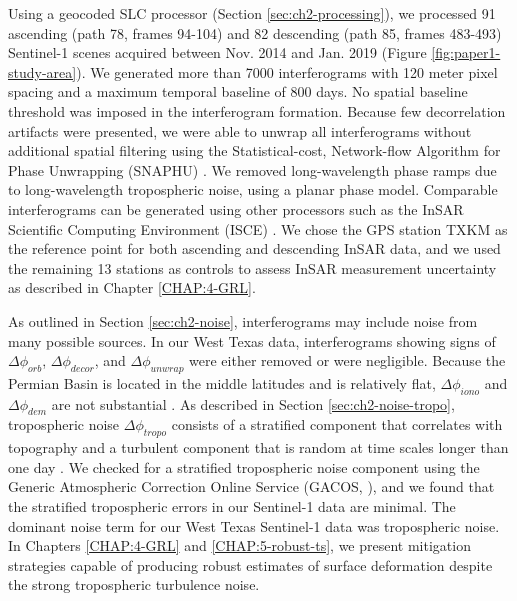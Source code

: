 Using a geocoded SLC processor \citep{Zheng2017PhaseCorrectionSingle, Zebker2017UserFriendlyInsar} (Section \ref{sec:ch2-processing}), we processed 91 ascending (path 78, frames 94-104) and 82 descending (path 85, frames 483-493) Sentinel-1 scenes acquired between Nov. 2014 and Jan. 2019 (Figure \ref{fig:paper1-study-area}). We generated more than 7000 interferograms with 120 meter pixel spacing and a maximum temporal baseline of 800 days. No spatial baseline threshold was imposed in the interferogram formation. Because few decorrelation artifacts were presented, we were able to unwrap all interferograms without additional spatial filtering using the Statistical-cost, Network-flow Algorithm for Phase Unwrapping (SNAPHU) \citep{Chen2001TwoDimensionalPhase}. We removed long-wavelength phase ramps due to long-wavelength tropospheric noise, using a planar phase model. Comparable interferograms can be generated using other processors such as the InSAR Scientific Computing Environment (ISCE) \citep{Rosen2012InsarScientificComputing}. 
We chose the GPS station TXKM as the reference point for both ascending and descending InSAR data, and we used the remaining 13 stations as controls to assess InSAR measurement uncertainty as described in Chapter \ref{CHAP:4-GRL}.

As outlined in Section \ref{sec:ch2-noise}, interferograms may include noise from many possible sources. %
In our West Texas data, interferograms showing signs of $\Delta \phi_{orb}$, $\Delta \phi_{decor}$, and $\Delta \phi_{unwrap}$ were either removed or were negligible. Because the Permian Basin is located in the middle latitudes and is relatively flat, $\Delta \phi_{iono}$ and $\Delta \phi_{dem}$  are not substantial \citep{Fattahi2013DemErrorCorrection, Liang2019IonosphericCorrectionInsar}. 
As described in Section \ref{sec:ch2-noise-tropo}, tropospheric noise $\Delta \phi_{tropo}$ consists of a stratified component that correlates with topography \citep{Doin2009CorrectionsStratifiedTropospheric} and a turbulent component that is random at time scales longer than one day \citep{Emardson2003NeutralAtmosphericDelay}. We checked for a stratified tropospheric noise component using the Generic Atmospheric Correction Online Service (GACOS, \citep{Yu2018GenericAtmosphericCorrection, Yu2018InterferometricSyntheticAperture}), and we found that the stratified tropospheric errors in our Sentinel-1 data are minimal.
The dominant noise term for our West Texas Sentinel-1 data was tropospheric noise.
In Chapters \ref{CHAP:4-GRL} and \ref{CHAP:5-robust-ts}, we present mitigation strategies capable of producing robust estimates of surface deformation despite the strong tropospheric turbulence noise.

